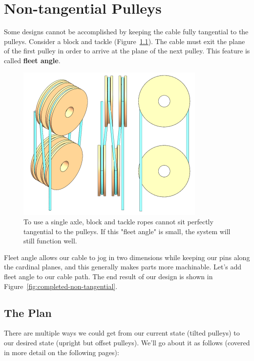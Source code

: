 \chapter{Non-tangential Pulleys}
\label{sec:non-tangential-pulleys}

Some designs cannot be accomplished by keeping the cable fully tangential to the
pulleys. Consider a block and tackle (Figure~\ref{fig:block_and_tackle}). The
cable must exit the plane of the first pulley in order to arrive at the plane of
the next pulley. This feature is called \textbf{fleet angle}.

\begin{figure}[H]
\begin{center}
\includegraphics{images/figures/BlockTackleCombined.png}
\end{center}
\caption{To use a single axle, block and tackle ropes cannot sit perfectly
tangential to the pulleys. If this "fleet angle" is small, the system will
still function well.
\label{fig:block_and_tackle}}

\end{figure}

Fleet angle allows our
cable to jog in two dimensions while keeping our pins along the cardinal planes, and this generally makes parts more machinable. Let's add fleet angle
to our cable path. The end result of our design is shown in
Figure~\ref{fig:completed-non-tangential}.

\section{The Plan}

There are multiple ways we could get from our current state (tilted pulleys) to
our desired state (upright but offset pulleys). We'll go about it as
follows (covered in more detail on the following pages):

